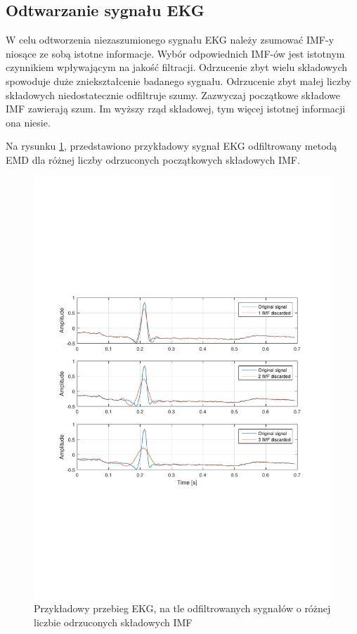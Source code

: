 \newpage

\subsection{Odtwarzanie sygnału EKG}
\label{sec:filtrMatlab}
\indent

W celu odtworzenia niezaszumionego sygnału EKG należy zsumować IMF-y niosące ze
sobą istotne informacje. Wybór odpowiednich IMF-ów jest istotnym czynnikiem
wpływającym na jakość filtracji. Odrzucenie zbyt wielu składowych spowoduje duże
zniekształcenie badanego sygnału. Odrzucenie zbyt małej liczby składowych
niedostatecznie odfiltruje szumy. Zazwyczaj początkowe składowe IMF zawierają
szum. Im wyższy rząd składowej, tym więcej istotnej informacji ona niesie.

Na rysunku \ref{rys:example_ekg}, przedstawiono przykładowy sygnał EKG
odfiltrowany metodą EMD dla różnej liczby odrzuconych początkowych składowych
IMF.

\begin{figure}[!htb]
    \begin{center}
        \includegraphics[width=14cm,trim=3cm 8cm 3cm 8cm,clip]
        {../img/ka_example.pdf}
    \end{center}
    \caption{Przykładowy przebieg EKG, na tle odfiltrowanych sygnałów o różnej
    liczbie odrzuconych składowych IMF}
    \label{rys:example_ekg}
\end{figure}



